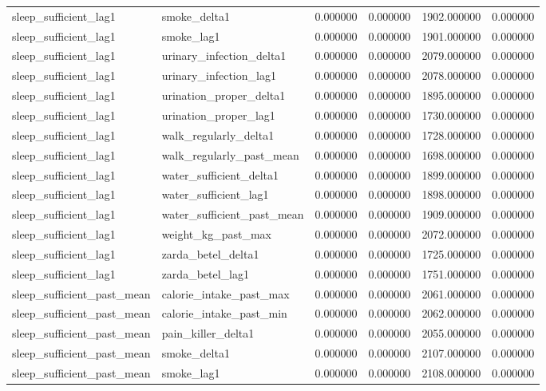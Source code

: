 \begin{longtable}{llrrrr}
sleep\_sufficient\_lag1 & smoke\_delta1 & 0.000000 & 0.000000 & 1902.000000 & 0.000000 \\
sleep\_sufficient\_lag1 & smoke\_lag1 & 0.000000 & 0.000000 & 1901.000000 & 0.000000 \\
sleep\_sufficient\_lag1 & urinary\_infection\_delta1 & 0.000000 & 0.000000 & 2079.000000 & 0.000000 \\
sleep\_sufficient\_lag1 & urinary\_infection\_lag1 & 0.000000 & 0.000000 & 2078.000000 & 0.000000 \\
sleep\_sufficient\_lag1 & urination\_proper\_delta1 & 0.000000 & 0.000000 & 1895.000000 & 0.000000 \\
sleep\_sufficient\_lag1 & urination\_proper\_lag1 & 0.000000 & 0.000000 & 1730.000000 & 0.000000 \\
sleep\_sufficient\_lag1 & walk\_regularly\_delta1 & 0.000000 & 0.000000 & 1728.000000 & 0.000000 \\
sleep\_sufficient\_lag1 & walk\_regularly\_past\_mean & 0.000000 & 0.000000 & 1698.000000 & 0.000000 \\
sleep\_sufficient\_lag1 & water\_sufficient\_delta1 & 0.000000 & 0.000000 & 1899.000000 & 0.000000 \\
sleep\_sufficient\_lag1 & water\_sufficient\_lag1 & 0.000000 & 0.000000 & 1898.000000 & 0.000000 \\
sleep\_sufficient\_lag1 & water\_sufficient\_past\_mean & 0.000000 & 0.000000 & 1909.000000 & 0.000000 \\
sleep\_sufficient\_lag1 & weight\_kg\_past\_max & 0.000000 & 0.000000 & 2072.000000 & 0.000000 \\
sleep\_sufficient\_lag1 & zarda\_betel\_delta1 & 0.000000 & 0.000000 & 1725.000000 & 0.000000 \\
sleep\_sufficient\_lag1 & zarda\_betel\_lag1 & 0.000000 & 0.000000 & 1751.000000 & 0.000000 \\
sleep\_sufficient\_past\_mean & calorie\_intake\_past\_max & 0.000000 & 0.000000 & 2061.000000 & 0.000000 \\
sleep\_sufficient\_past\_mean & calorie\_intake\_past\_min & 0.000000 & 0.000000 & 2062.000000 & 0.000000 \\
sleep\_sufficient\_past\_mean & pain\_killer\_delta1 & 0.000000 & 0.000000 & 2055.000000 & 0.000000 \\
sleep\_sufficient\_past\_mean & smoke\_delta1 & 0.000000 & 0.000000 & 2107.000000 & 0.000000 \\
sleep\_sufficient\_past\_mean & smoke\_lag1 & 0.000000 & 0.000000 & 2108.000000 & 0.000000 \\

\end{longtable}
